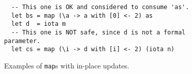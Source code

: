\begin{figure}
\begin{lstlisting}
  -- This one is OK and considered to consume 'as'.
  let bs = map (\a -> a with [0] <- 2) as
  let d  = iota m
  -- This one is NOT safe, since d is not a formal parameter.
  let cs = map (\i -> d with [i] <- 2) (iota n)
\end{lstlisting}
  \caption{Examples of \lstinline{map}s with in-place updates.}
  \label{fig:map-in-place-update}
\end{figure}

